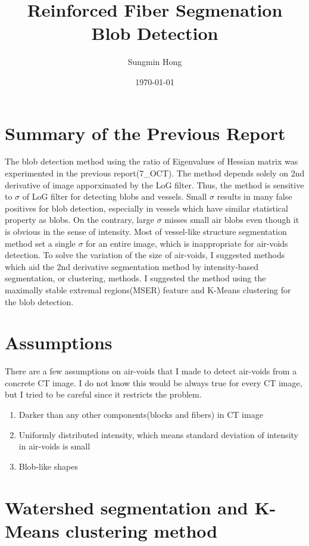 \documentclass[10pt]{article}
\title{Reinforced Fiber Segmenation \\ Blob Detection }
\author{Sungmin Hong}
\date{\today}
\begin{document}
\maketitle

\section*{Summary of the Previous Report}
\label{prev}


The blob detection method using the ratio of Eigenvalues of Hessian matrix was experimented in the previous report(7\_OCT). 
The method depends solely on 2nd derivative of image apporximated by the LoG filter. 
Thus, the method is sensitive to $\sigma$ of LoG filter for detecting blobs and vessels.
Small $\sigma$ results in many false positives for blob detection, especially in vessels which have similar statistical property as blobs. 
On the contrary, large $\sigma$ misses small air blobs even though it is obvious in the sense of intensity. 
Most of vessel-like structure segmentation method set a single $\sigma$ for an entire image, which is inappropriate for air-voids detection. 
To solve the variation of the size of air-voids, I suggested methods which aid the 2nd derivative segmentation method by intensity-based segmentation, or clustering, methods.
I suggested the method using the maximally stable extremal regions(MSER) feature and K-Means clustering for the blob detection. 


\section*{Assumptions}
\label{assumption}

There are a few assumptions on air-voids that I made to detect air-voids from a concrete CT image. 
I do not know this would be always true for every CT image, but I tried to be careful since it restricts the problem.

\begin{enumerate}
 \item Darker than any other components(blocks and fibers) in CT image
 \item Uniformly distributed intensity, which means standard deviation of intensity in air-voids is small
 \item Blob-like shapes 
\end{enumerate}

\section*{Watershed segmentation and K-Means clustering method}
\label{methods}
\end{document}

